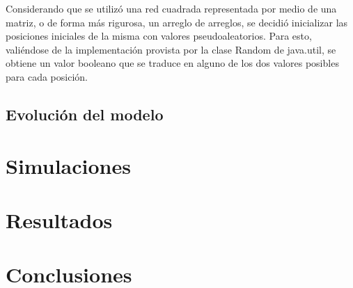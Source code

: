 \documentclass[12pt]{article}
\begin{document}
Considerando que se utilizó una red cuadrada representada por medio de una matriz, o de forma más rigurosa, un arreglo de arreglos, se decidió inicializar las posiciones iniciales de la misma con valores pseudoaleatorios. Para esto, valiéndose de la implementación provista por la clase Random de java.util, se obtiene un valor booleano que se traduce en alguno de los dos valores posibles para cada posición.

\subsection{Evolución del modelo}


\section{Simulaciones}

\section{Resultados}

\section{Conclusiones}
\end{document}
